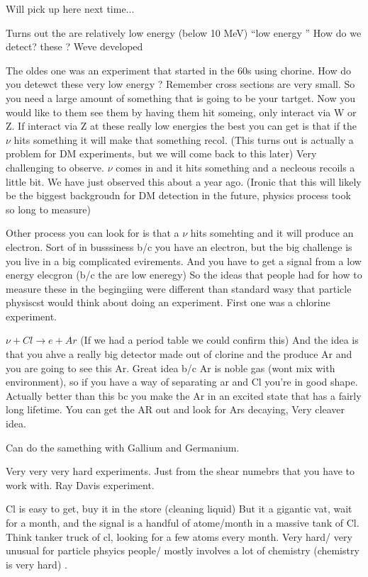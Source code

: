{Will pick up here next time...

Turns out the \nus are relatively low energy (below 10 MeV) ``low energy \nus''
How do we detect? these \nus ?
Weve developed 

The oldes one was an experiment that started in the 60s using chorine. 
How do you detewct these very low energy \nus ?
Remember cross sections are very small.
So you need a large amount of something that is going to be your tartget. 
Now you would like to them see them by having them hit someing, only interact via W or Z. 
If interact via Z at these really low energies the best you can get is that if the $\nu$ hits something it will make that something recol. 
(This turns out is actually a problem for DM experiments, but we will come back to this later) 
Very challenging to observe.  
$\nu$ comes in and it hits something and a necleous recoils a little bit. 
We have just observed this about a year ago. (Ironic that this will likely be the biggest backgroudn for DM detection in the future, physics process took so long to measure) 

Other process you can look for is that a $\nu$ hits somehting and it will produce an electron. 
Sort of in busssiness b/c you have an electron, but the big challenge is you live in a big complicated evirements.
And you have to get a signal from a low energy elecgron (b/c the \nus are low eneregy) 
So the ideas that people had for how to measure these \nus in the begingiing were different than standard wasy that particle physiscst would think about doing an experiment. 
First one was a chlorine experiment. 

$\nu + Cl \rightarrow e + Ar$
(If we had a period table we could confirm this) 
And the idea is that you ahve a really big detector made out of clorine and the \nus produce Ar and you are going to see this Ar. 
Great idea b/c Ar is noble gas (wont mix with environment), so if you have a way of separating ar and Cl you're in good shape. 
Actually better than this bc you make the Ar in an excited state that has a fairly long lifetime. 
You can get the AR out and look for Ars decaying, Very cleaver idea. 

Can do the samething with Gallium and Germanium. 

Very very very hard experiments. Just from the shear numebrs that you have to work with. 
Ray Davis experiment. 

Cl is easy to get, buy it in the store (cleaning liquid)
But it a gigantic vat, wait for a month, and the signal is a handful of atome/month in a massive tank of Cl. 
Think tanker truck of cl, looking for a few atoms every month.
Very hard/ very unusual for particle phsyics people/  mostly involves a lot of chemistry (chemistry is very hard) .

}
